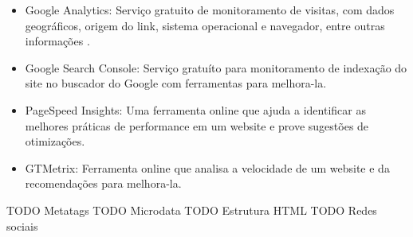 \begin{itemize}
  \item Google Analytics: Serviço gratuito de monitoramento de visitas, com dados geográficos, origem do link, sistema operacional e navegador, entre outras informações \cite{Analytics}.
  \item Google Search Console: Serviço gratuíto para monitoramento de indexação do site no buscador do Google com ferramentas para melhora-la. 
  \item PageSpeed Insights: Uma ferramenta online que ajuda a identificar as melhores práticas de performance em um website e prove sugestões de otimizações.
  \item GTMetrix: Ferramenta online que analisa a velocidade de um website e da recomendações para melhora-la.
\end{itemize}

TODO Metatags
TODO Microdata
TODO Estrutura HTML
TODO Redes sociais

